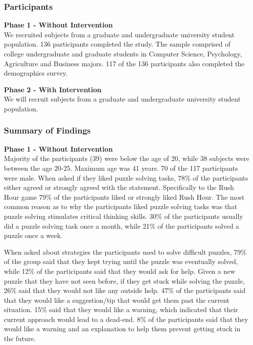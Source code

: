 \documentclass[doctor]{thesis} %
\theoremstyle{plain}
\begin{document}
\subsubsection*{Participants}
\textbf{Phase 1 - Without Intervention}\\
We recruited subjects from a graduate and undergraduate university student population. 136 participants completed the study. The sample comprised of college undergraduate and graduate students in Computer Science, Psychology, Agriculture and Business majors. 117 of the 136 participants also completed the demographics survey.

\textbf{Phase 2 - With Intervention}\\
We will recruit subjects from a graduate and undergraduate university student population.

\subsubsection*{Summary of Findings}
\textbf{Phase 1 - Without Intervention}\\
Majority of the participants (39) were below the age of 20, while 38 subjects were between the age 20-25. Maximum age was 41 years. 70 of the 117 participants were male. When asked if they liked puzzle solving tasks, 78\% of the participants either agreed or strongly agreed with the statement. Specifically to the Rush Hour game 79\% of the participants liked or strongly liked Rush Hour. The most common reason as to why the participants liked puzzle solving tasks was that puzzle solving stimulates critical thinking skills. 30\% of the participants usually did a puzzle solving task once a month, while 21\% of the participants solved a puzzle once a week.

When asked about strategies the participants used to solve difficult puzzles, 79\% of the group said that they kept trying until the puzzle was eventually solved, while 12\% of the participants said that they would ask for help.  Given a new puzzle that they have not seen before, if they get stuck while solving the puzzle, 26\% said that they would not like any outside help. 47\% of the participants said that they would like a suggestion/tip that would get them past the current situation. 15\% said that they would like a warning, which indicated that their current approach would lead to a dead-end. 8\% of the participants said that they would like a warning and an explanation to help them prevent getting stuck in the future.  
\end{document}
